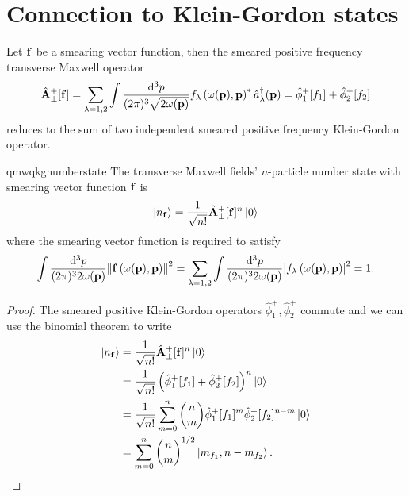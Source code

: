 \section{Connection to Klein-Gordon states}

\begin{corollary}\label{thm:qmw_qkg}
	Let $\vb{f}$ be a smearing vector function, then the smeared positive frequency transverse Maxwell operator
	\begin{equation}
		\hat{\vb{A}}_\perp^+[\vb{f}]
		=
		\sum_{\lambda=1,2}
		\int\frac{\dd[3]{p}}{(2\pi)^3\sqrt{2\omega(\vb{p})}}
		f_\lambda\left(\omega(\vb{p}),\vb{p}\right)^*
		\hat{a}_\lambda^\dagger(\vb{p})
		=
		\hat\phi_1^+[f_1]
		+
		\hat\phi_2^+[f_2]
	\end{equation}
	 reduces to the sum of two independent smeared positive frequency Klein-Gordon operator.
\end{corollary}

\begin{lemma}{qmwqkgnumberstate}\label{thm:qmw_qkg_number_state}
	The transverse Maxwell fields' $n$-particle number state with smearing vector function $\vb{f}$ is
	\begin{equation}
		\label{eq:qmw_number_state}
		\ket{n_{\vb{f}}}
		=
		\frac{1}{\sqrt{n!}}
		\hat{\vb{A}}_\perp^+[\vb{f}]^n
		\ket{0}
	\end{equation}
	where the smearing vector function is required to satisfy~\cite[p.~175]{Itzykson2012}
	\begin{equation}
		\int\frac{\dd[3]{p}}{(2\pi)^32\omega(\vb{p})}
		\norm{\vb{f}\left(\omega(\vb{p}),\vb{p}\right)}^2
		=
		\sum_{\lambda=1,2}
		\int\frac{\dd[3]{p}}{(2\pi)^32\omega(\vb{p})}
		\abs{f_\lambda\left(\omega(\vb{p}),\vb{p}\right)}^2
		=
		1
		.
	\end{equation}
\end{lemma}
\begin{proof}
	The smeared positive Klein-Gordon operators $\hat\phi^+_1,\hat\phi^+_2$ commute and we can use the binomial theorem to write
	\begin{equation*}
		\begin{split}
			\ket{n_{\vb{f}}}
			&=
			\frac{1}{\sqrt{n!}}
			\hat{\vb{A}}_\perp^+[\vb{f}]^n
			\ket{0}
			\\
			&=
			\frac{1}{\sqrt{n!}}
			\left(
				\hat\phi_1^+[f_1]
				+
				\hat\phi_2^+[f_2]
			\right)^n
			\ket{0}
			\\
			&=
			\frac{1}{\sqrt{n!}}
			\sum^n_{m=0}
			\binom{n}{m}
			\hat\phi_1^+[f_1]^m
			\hat\phi_2^+[f_2]^{n-m}
			\ket{0}
			\\
			&=
			\sum^n_{m=0}
			\binom{n}{m}^{1/2}
			\ket{m_{f_1},n-m_{f_2}}
			.
		\end{split}
	\end{equation*}
\end{proof}

